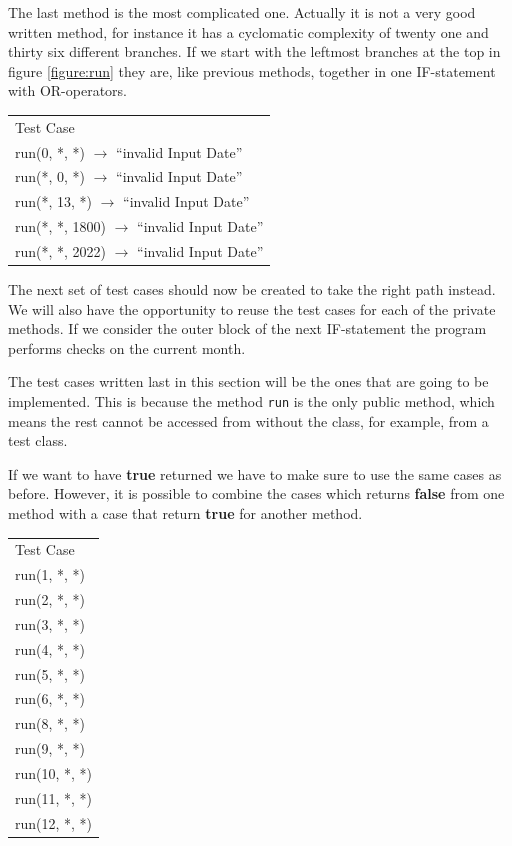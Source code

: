 \documentclass[a4paper]{article}
\begin{document}
The last method is the most complicated one. Actually it is not a very good written method, for instance it has a cyclomatic complexity of twenty one and thirty six different branches. If we start with the leftmost branches at the top in figure \ref{figure:run} they are, like previous methods, together in one IF-statement with OR-operators.

\begin{table}[h]
	\begin{tabular}{l}
		Test Case\\
		run(0, *, *) $\rightarrow$ ``invalid Input Date''\\
		run(*, 0, *) $\rightarrow$ ``invalid Input Date''\\
		run(*, 13, *) $\rightarrow$ ``invalid Input Date''\\
		run(*, *, 1800) $\rightarrow$ ``invalid Input Date''\\		
		run(*, *, 2022) $\rightarrow$ ``invalid Input Date''\\
	\end{tabular}
\end{table}

The next set of test cases should now be created to take the right path instead. We will also have the opportunity to reuse the test cases for each of the private methods. If we consider the outer block of the next IF-statement the program performs checks on the current month. 

The test cases written last in this section will be the ones that are going to be implemented. This is because the method \texttt{run} is the only public method, which means the rest cannot be accessed from without the class, for example, from a test class.

If we want to have \textbf{true} returned we have to make sure to use the same cases as before. However, it is possible to combine the cases which returns \textbf{false} from one method with a case that return \textbf{true} for another method. 

\begin{table}[h]
	\begin{tabular}{l}
		Test Case\\
		run(1, *, *)\\
		run(2, *, *)\\
		run(3, *, *)\\
		run(4, *, *)\\
		run(5, *, *)\\
		run(6, *, *)\\
		run(8, *, *)\\
		run(9, *, *)\\
		run(10, *, *)\\
		run(11, *, *)\\
		run(12, *, *)\\
	\end{tabular}
\end{table}
\end{document}
